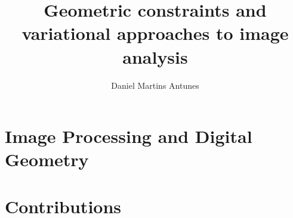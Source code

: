 \documentclass[a4paper,12pt]{book}
\begin{document}
	\title{Geometric constraints and variational approaches to image analysis}
	\author{Daniel Martins Antunes}
	\date{}
	\maketitle

	
	

	
	\tableofcontents	
	
	
	
	\part{Image Processing and Digital Geometry}
	
	
	
	
	\part{Contributions}	
	
	
		
	
	
		
	\begin{appendices}
					
		
	\end{appendices}
	
\printbibliography
	
\end{document}
